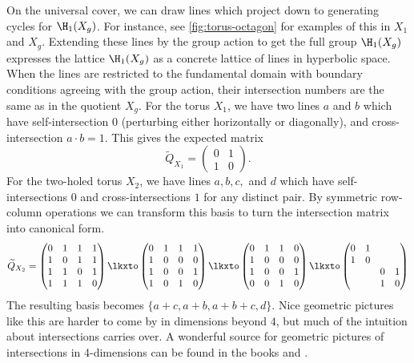 \begin{example}
	On the universal cover, we can draw lines which project down to generating cycles for $\H_1(X_g)$. For instance, see \cref{fig:torus-octagon} for examples of this in $X_1$ and $X_g$. Extending these lines by the group action to get the full group $\H_1(X_g)$ expresses the lattice $\H_1(X_g)$ as a concrete lattice of lines in hyperbolic space.
	When the lines are restricted to the fundamental domain with boundary conditions agreeing with the group action, their intersection numbers are the same as in the quotient $X_g$. For the torus $X_1$, we have two lines $a$ and $b$ which have self-intersection $0$ (perturbing either horizontally or diagonally), and cross-intersection $a\cdot b = 1$. This gives the expected matrix
	\[
		\widetilde{Q}_{X_1}=\begin{pmatrix}0 & 1\\ 1 & 0\end{pmatrix}.
	\]
	For the two-holed torus $X_2$, we have lines $a,b,c,$ and $d$ which have self-intersections $0$ and cross-intersections $1$ for any distinct pair. By symmetric row-column operations we can transform this basis to turn the intersection matrix into canonical form.
	\[
		\widetilde{Q}_{X_2} = 
		\begin{pmatrix} 
			0 & 1 & 1 & 1\\
			1 & 0 & 1 & 1\\
			1 & 1 & 0 & 1\\
			1 & 1 & 1 & 0
		\end{pmatrix}
		\lkxto
		\begin{pmatrix} 
			0 & 1 & 1 & 1\\
			1 & 0 & 0 & 0\\
			1 & 0 & 0 & 1\\
			1 & 0 & 1 & 0
		\end{pmatrix}
		\lkxto
		\begin{pmatrix} 
			0 & 1 & 1 & 0\\
			1 & 0 & 0 & 0\\
			1 & 0 & 0 & 1\\
			0 & 0 & 1 & 0
		\end{pmatrix}
		\lkxto 
		\begin{pmatrix} 
			0 & 1 & &\\
			1 & 0 & &\\
			& & 0 & 1\\
			& & 1 & 0
		\end{pmatrix}
	\]
	The resulting basis becomes $\{a+c, a+b,a+b+c,d\}$. Nice geometric pictures like this are harder to come by in dimensions beyond $4$, but much of the intuition about intersections carries over. A wonderful source for geometric pictures of intersections in 4-dimensions can be found in the books \cite{behrens2021discembedding} and \cite{scorpan2005wild}.
\end{example}


